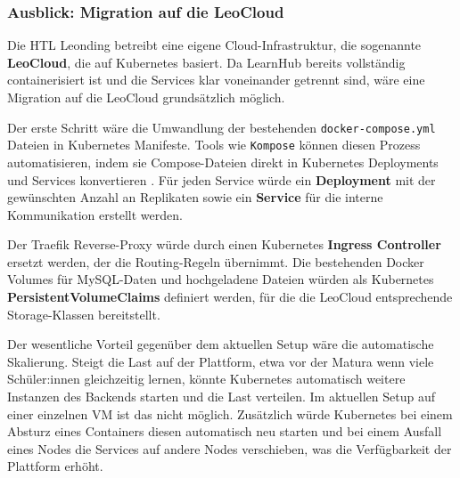 \subsubsection{Ausblick: Migration auf die LeoCloud}

Die HTL Leonding betreibt eine eigene Cloud-Infrastruktur, die 
sogenannte \textbf{LeoCloud}, die auf Kubernetes basiert. Da 
LearnHub bereits vollständig containerisiert ist und die Services 
klar voneinander getrennt sind, wäre eine Migration auf die 
LeoCloud grundsätzlich möglich.

Der erste Schritt wäre die Umwandlung der bestehenden 
\texttt{docker-compose.yml} Dateien in Kubernetes Manifeste. 
Tools wie \texttt{Kompose} können diesen Prozess automatisieren, 
indem sie Compose-Dateien direkt in Kubernetes Deployments und 
Services konvertieren \cite{kubernetes_docs}. Für jeden Service 
würde ein \textbf{Deployment} mit der gewünschten Anzahl an 
Replikaten sowie ein \textbf{Service} für die interne 
Kommunikation erstellt werden.

Der Traefik Reverse-Proxy würde durch einen Kubernetes 
\textbf{Ingress Controller} ersetzt werden, der die 
Routing-Regeln übernimmt. Die bestehenden Docker Volumes für 
MySQL-Daten und hochgeladene Dateien würden als Kubernetes 
\textbf{PersistentVolumeClaims} definiert werden, für die die 
LeoCloud entsprechende Storage-Klassen bereitstellt.

Der wesentliche Vorteil gegenüber dem aktuellen Setup wäre die 
automatische Skalierung. Steigt die Last auf der Plattform, 
etwa vor der Matura wenn viele Schüler:innen gleichzeitig 
lernen, könnte Kubernetes automatisch weitere Instanzen des 
Backends starten und die Last verteilen. Im aktuellen Setup 
auf einer einzelnen VM ist das nicht möglich. Zusätzlich würde 
Kubernetes bei einem Absturz eines Containers diesen 
automatisch neu starten und bei einem Ausfall eines Nodes die 
Services auf andere Nodes verschieben, was die Verfügbarkeit 
der Plattform erhöht.